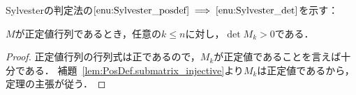 Sylvesterの判定法の$\ref{enu:Sylvester_posdef} \implies \ref{enu:Sylvester_det}$を示す：

\begin{theorem}
  \label{thm:posDef_leading_minors_pos}
  \leanok
  $M$が正定値行列であるとき，任意の$k \le n$に対し，$\det M_k > 0$である．
\end{theorem}

\begin{proof}
  正定値行列の行列式は正であるので，$M_k$が正定値であることを言えば十分である．
  補題~\ref{lem:PosDef.submatrix_injective}より$M_k$は正定値であるから，定理の主張が従う．
\end{proof}